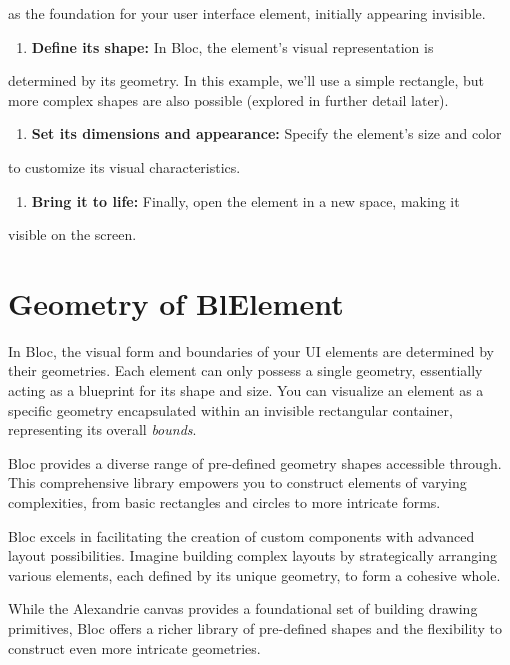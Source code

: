 \documentclass[10pt,twoside,english]{_support/latex/sbabook/sbabook}
\begin{document}
as the foundation for your user interface element, initially appearing
invisible.

\begin{enumerate}
    \item \textbf{Define its shape:} In Bloc, the element's visual representation is
\end{enumerate}

determined by its geometry. In this example, we'll use a simple rectangle, but
more complex shapes are also possible (explored in further detail later).

\begin{enumerate}
    \item \textbf{Set its dimensions and appearance:} Specify the element's size and color
\end{enumerate}

to customize its visual characteristics.

\begin{enumerate}
    \item \textbf{Bring it to life:} Finally, open the element in a new space, making it
\end{enumerate}

visible on the screen.

\section{Geometry of BlElement}
In Bloc, the visual form and boundaries of your UI elements are determined by
their geometries. Each element can only possess a single geometry, essentially
acting as a blueprint for its shape and size. You can visualize an element as a
specific geometry encapsulated within an invisible rectangular container,
representing its overall \textit{bounds}.

Bloc provides a diverse range of pre-defined geometry shapes accessible through. This comprehensive library empowers you to
construct elements of varying complexities, from basic rectangles and circles to
more intricate forms.

Bloc excels in facilitating the creation of custom components with advanced
layout possibilities. Imagine building complex layouts by strategically
arranging various elements, each defined by its unique geometry, to form a
cohesive whole.

While the Alexandrie canvas provides a foundational set of building drawing
primitives, Bloc offers a richer library of pre-defined shapes and the
flexibility to construct even more intricate geometries.
\end{document}
